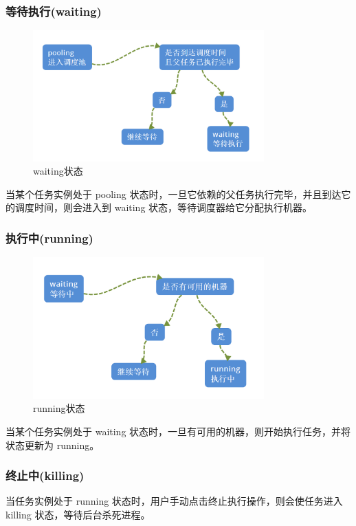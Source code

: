 ﻿\documentclass[a4paper]{report}
\begin{document}
\subsubsection{等待执行(waiting)} %
\begin{figure}[htbp]
\centering\includegraphics[width=3.5in]{waiting.png}
\caption{waiting状态}
\end{figure}
当某个任务实例处于 pooling 状态时，一旦它依赖的父任务执行完毕，并且到达它的调度时间，则会进入到 waiting 状态，等待调度器给它分配执行机器。

\subsubsection{执行中(running)} %
\begin{figure}[htbp]
\centering\includegraphics[width=3.5in]{running.png}
\caption{running状态}
\end{figure}
当某个任务实例处于 waiting 状态时，一旦有可用的机器，则开始执行任务，并将状态更新为 running。



\subsubsection{终止中(killing)} %
当任务实例处于 running 状态时，用户手动点击终止执行操作，则会使任务进入 killing 状态，等待后台杀死进程。
\end{document}
